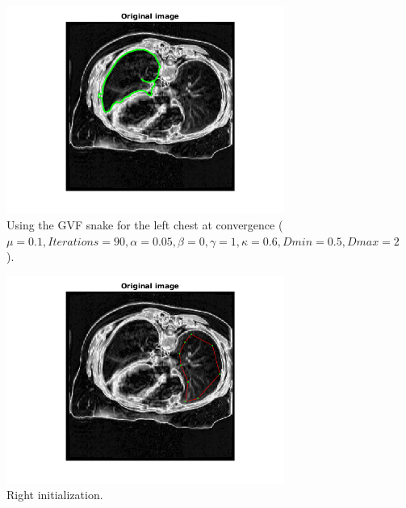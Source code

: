 \documentclass{article}
\begin{document}
\begin{figure}[H]
\begin{subfigure}{0.45\textwidth}
  \includegraphics[width=\linewidth]{newLeftGFV.png}
  \caption{Using the GVF snake for the left chest at convergence ($\mu=0.1, Iterations=90, \alpha=0.05, \beta=0, \gamma=1,\kappa=0.6,Dmin=0.5,Dmax=2$).}
  \label{c}
\end{subfigure}
\begin{subfigure}{0.45\textwidth}
  \centering
  \includegraphics[width=\linewidth]{newRightinit.png}
  \caption{Right initialization.}
  \label{d}
\end{subfigure}
\begin{subfigure}{0.45\textwidth}
  \centering

\end{subfigure}
\end{figure}
\end{document}
